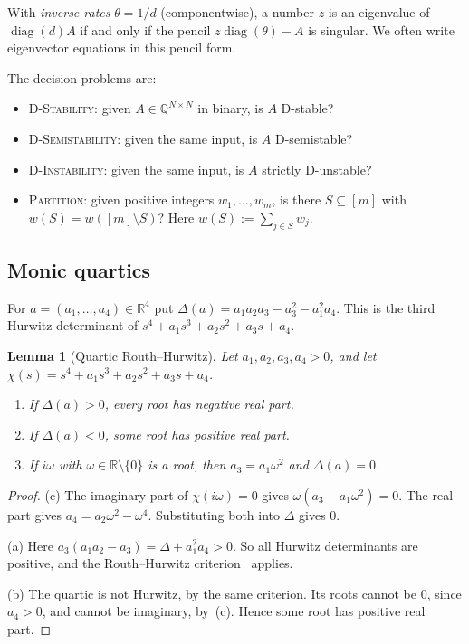 \documentclass[11pt,a4paper]{article}
\theoremstyle{plain}
\newtheorem{lemma}[theorem]{Lemma}
\theoremstyle{definition}
\theoremstyle{remark}
\newcommand{\R}{\mathbb{R}}
\newcommand{\Q}{\mathbb{Q}}
\newcommand{\diag}{\operatorname{diag}}
\newcommand{\prob}[1]{\textup{\textsc{#1}}}
\begin{document}
With \emph{inverse rates} $\theta=1/d$ (componentwise), a number $z$ is an eigenvalue
of $\diag(d)A$ if and only if the pencil $z\diag(\theta)-A$ is singular. We often
write eigenvector equations in this pencil form.

The decision problems are:
\begin{itemize}
\item \prob{D-Stability}: given $A\in\Q^{N\times N}$ in binary, is $A$ D-stable?
\item \prob{D-Semistability}: given the same input, is $A$ D-semistable?
\item \prob{D-Instability}: given the same input, is $A$ strictly D-unstable?
\item \prob{Partition}: given positive integers $w_1,\dots,w_m$, is there
$S\subseteq[m]$ with $w(S)=w([m]\setminus S)$? Here $w(S):=\sum_{j\in S}w_j$.
\end{itemize}

\subsection{Monic quartics}
For $a=(a_1,\dots,a_4)\in\R^4$ put $\Delta(a)=a_1a_2a_3-a_3^2-a_1^2a_4$. This is the third
Hurwitz determinant of $s^4+a_1s^3+a_2s^2+a_3s+a_4$.

\begin{lemma}[Quartic Routh--Hurwitz]\label{lem:quartic}
Let $a_1,a_2,a_3,a_4>0$, and let $\chi(s)=s^4+a_1s^3+a_2s^2+a_3s+a_4$.
\begin{enumerate}[label=(\alph*)]
\item If $\Delta(a)>0$, every root has negative real part.
\item If $\Delta(a)<0$, some root has positive real part.
\item If $i\omega$ with $\omega\in\R\setminus\{0\}$ is a root, then $a_3=a_1\omega^2$ and
$\Delta(a)=0$.
\end{enumerate}
\end{lemma}
\begin{proof}
(c) The imaginary part of $\chi(i\omega)=0$ gives $\omega(a_3-a_1\omega^2)=0$. The real part
gives $a_4=a_2\omega^2-\omega^4$. Substituting both into $\Delta$ gives $0$.

(a) Here $a_3(a_1a_2-a_3)=\Delta+a_1^2a_4>0$. So all Hurwitz determinants are positive,
and the Routh--Hurwitz criterion~\cite{gantmacher1959} applies.

(b) The quartic is not Hurwitz, by the same criterion. Its roots cannot be $0$, since
$a_4>0$, and cannot be imaginary, by~(c). Hence some root has positive real part.
\end{proof}
\end{document}
